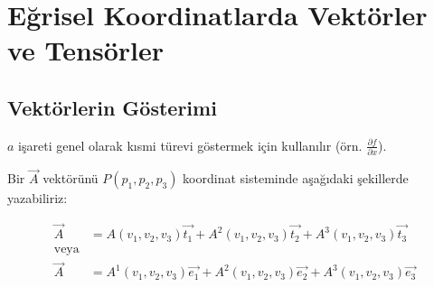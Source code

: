 \documentclass[11pt,letterpaper,twocolumn]{fenbil}
\begin{document}

\hspace{25pt}
\hspace{25pt}
\hspace{25pt}


\section{Eğrisel Koordinatlarda Vektörler ve Tensörler}

\subsection{Vektörlerin Gösterimi}

$a$ işareti genel olarak kısmi türevi göstermek için kullanılır (örn. $\frac{\partial f}{\partial x}$).

Bir $\vec{A}$ vektörünü $P(p_1, p_2, p_3)$ koordinat sisteminde aşağıdaki şekillerde yazabiliriz:

\begin{align}
\vec{A} &= A(v_1, v_2, v_3)\vec{t_1} + A^2(v_1, v_2, v_3)\vec{t_2} + A^3(v_1, v_2, v_3)\vec{t_3} \\
\text{veya} \\
\vec{A} &= A^1(v_1, v_2, v_3)\vec{e_1} + A^2(v_1, v_2, v_3)\vec{e_2} + A^3(v_1, v_2, v_3)\vec{e_3}
\end{align}
\end{document}

